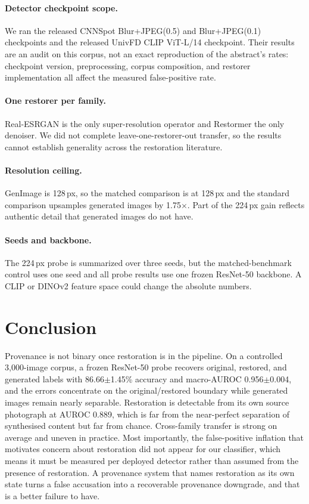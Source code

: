 \documentclass[runningheads]{llncs}
\begin{document}
\paragraph{Detector checkpoint scope.} We ran the released CNNSpot Blur+JPEG(0.5)
and Blur+JPEG(0.1) checkpoints and the released UnivFD CLIP ViT-L/14 checkpoint.
Their results are an audit on this corpus, not an exact reproduction of the
abstract's rates: checkpoint version, preprocessing, corpus composition, and
restorer implementation all affect the measured false-positive rate.

\paragraph{One restorer per family.} Real-ESRGAN is the only super-resolution
operator and Restormer the only denoiser. We did not complete leave-one-restorer-out
transfer, so the results cannot establish generality across the restoration literature.

\paragraph{Resolution ceiling.} GenImage is 128\,px, so the matched comparison is at
128\,px and the standard comparison upsamples generated images by 1.75$\times$. Part
of the 224\,px gain reflects authentic detail that generated images do not have.

\paragraph{Seeds and backbone.} The 224\,px probe is summarized over three seeds,
but the matched-benchmark control uses one seed and all probe results use one frozen
ResNet-50 backbone. A CLIP or DINOv2 feature space could change the absolute
numbers.

\section{Conclusion}

Provenance is not binary once restoration is in the pipeline. On a controlled
3{,}000-image corpus, a frozen ResNet-50 probe recovers original, restored, and
generated labels with 86.66$\pm$1.45\% accuracy and macro-AUROC
0.956$\pm$0.004, and the errors
concentrate on the original/restored boundary while generated images remain nearly
separable. Restoration is detectable from its own source photograph at AUROC 0.889,
which is far from the near-perfect separation of synthesised content but far from
chance. Cross-family transfer is strong on average and uneven in practice. Most
importantly, the false-positive inflation that motivates concern about restoration
did not appear for our classifier, which means it must be measured per deployed
detector rather than assumed from the presence of restoration. A provenance system
that names restoration as its own state turns a false accusation into a
recoverable provenance downgrade, and that is a better failure to have.
\end{document}
